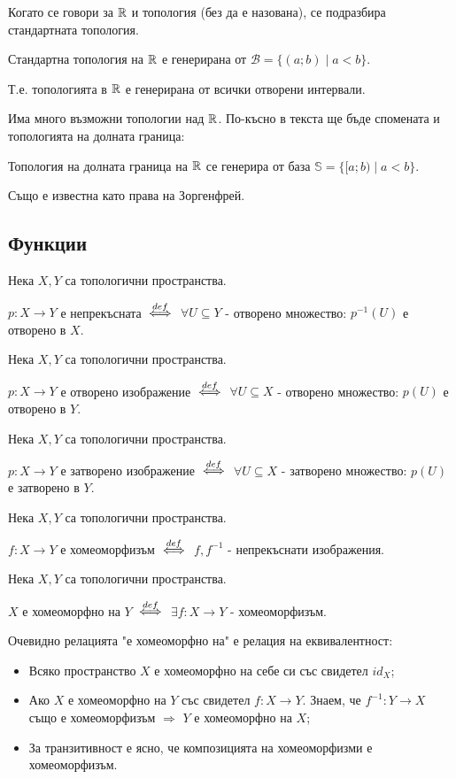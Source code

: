 Когато се говори за ${\mathbb{R}}$ и топология (без да е назована), се подразбира стандартната топология.
\begin{definition}
    Стандартна топология на ${\mathbb{R}}$ е генерирана от $\mathcal B = \{(a;b) \mid a<b\}$.
    
    Т.е. топологията в ${\mathbb{R}}$ е генерирана от всички отворени интервали.
\end{definition}
Има много възможни топологии над ${\mathbb{R}}$. По-късно в текста ще бъде спомената и топологията на долната граница:
\begin{definition}
    Топология на долната граница на ${\mathbb{R}}$ се генерира от база $\mathbb S = \{[a; b)\mid a < b\}$.

    Също е известна като права на Зоргенфрей.
\end{definition}

\subsection{Функции}
\begin{definition}
    Нека $X, Y$ са топологични пространства.
    
    $p: X \to Y$ е непрекъсната ${\overset{def}{\iff}}$ $\forall U \subseteq Y$ - отворено множество: $p^{-1}(U)$ е отворено в $X$.
\end{definition}
\begin{definition}
    Нека $X, Y$ са топологични пространства.
    
    $p: X \to Y$ е отворено изображение ${\overset{def}{\iff}}$ $\forall U \subseteq X$ - отворено множество: $p(U)$ е отворено в $Y$.
\end{definition}
\begin{definition}
    Нека $X, Y$ са топологични пространства.
    
    $p: X \to Y$ е затворено изображение ${\overset{def}{\iff}}$ $\forall U \subseteq X$ - затворено множество: $p(U)$ е затворено в $Y$.
\end{definition}
\begin{definition}
    Нека $X, Y$ са топологични пространства.
    
    $f: X \to Y$ е хомеоморфизъм ${\overset{def}{\iff}}$ $f, f^{-1}$ - непрекъснати изображения.
\end{definition}
\begin{definition}
    Нека $X, Y$ са топологични пространства.
    
    $X$ е хомеоморфно на $Y$ ${\overset{def}{\iff}}$ $\exists f: X \to Y$ - хомеоморфизъм.
\end{definition}
\begin{fact}
    Очевидно релацията "е хомеоморфно на"  е релация на еквивалентност:
    \begin{itemize}
        \item Всяко пространство $X$ е хомеоморфно на себе си със свидетел $id_X$;
        \item Ако $X$ е хомеоморфно на $Y$ със свидетел $f: X \to Y$. Знаем, че $f^{-1}: Y \to X$ също е хомеоморфизъм $\Rightarrow$ $Y$ е хомеоморфно на $X$;
        \item За транзитивност е ясно, че композицията на хомеоморфизми е хомеоморфизъм.
    \end{itemize}
\end{fact}

